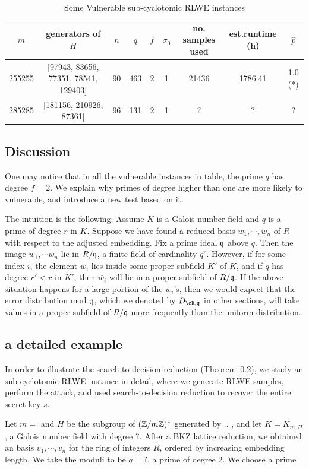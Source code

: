 \documentclass{amsart}
\begin{document}
\begin{table}
\caption{Some Vulnerable sub-cyclotomic RLWE instances}
\begin{tabular}{c|c|c|c|c|c|c|c|c}
$m$ & generators of $H$ & $n$ & $q$ & $f$ & $\sigma_0$ & no. samples used & est.runtime (h) & $\hat{p}$ \\ \hline
255255 & [97943, 83656, 77351, 78541, 129403] & 90 & 463 & 2 & 1 & 21436 & 1786.41 & 1.0 (*) \\
285285 & [181156, 210926, 87361] & 96 & 131 & 2 & 1 & ? & ? & ?
\end{tabular}
\end{table}

\subsection{Discussion}
One may notice that in all the vulnerable instances in table, the prime $q$ has degree $f = 2$. We explain why primes of degree higher than one are more likely to vulnerable, and introduce a new test based on it.

The intuition is the following: Assume $K$ is a Galois number field and $q$ is a prime of degree $r$ in $K$. Suppose we have found a reduced basis $w_1,\cdots, w_n$ of $R$ with respect to the adjusted embedding. Fix a prime ideal $\mathfrak{q}$ above $q$. Then the image $\bar{w_1}, \cdots \bar{w_n}$ lie in $R/\mathfrak{q}$, a finite field of cardinality $q^r$. However, if for some index $i$, the element $w_i$ lies inside some proper subfield $K'$ of $K$, and if $q$ has degree $r' < r$ in $K'$, then  $\bar{w_i}$ will lie in a proper subfield of $R/\mathfrak{q}$. If the above situation happens for a large portion of the $w_i$'s, then we would expect that the error distribution mod $\mathfrak{q}$, which we denoted by $D_{\cR,\fq}$ in other sections, will take values in a proper subfield of $R/\mathfrak{q}$ more frequently than the uniform distribution.

\subsection{a detailed example}
In order to illustrate the search-to-decision reduction (Theorem~\ref{}), we study an sub-cyclotomic RLWE instance in detail, where we generate RLWE samples, perform the attack, and used search-to-decision reduction to recover the entire secret key $s$.


Let $m = $ and $H$ be the subgroup of $(\mathbb{Z}/m\mathbb{Z})^*$ generated by .. , and let $K = K_{m,H}$, a Galois number field with degree ?. After a BKZ lattice reduction, we obtained an basis $v_1, \cdots, v_n$ for the ring of integers $R$, ordered by increasing embedding length. We take the moduli to be $q = ?$, a prime of degree 2. We choose a prime
\end{document}
